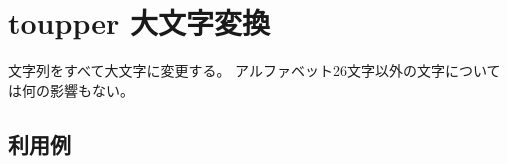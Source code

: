 
%

\section{toupper 大文字変換\label{sect:toupper}}
文字列をすべて大文字に変更する。
アルファベット26文字以外の文字については何の影響もない。

\subsection*{利用例}


%

